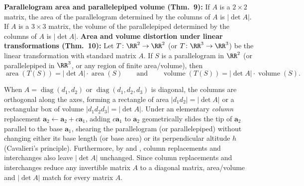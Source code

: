 \documentclass[10pt]{scrartcl}
\newcommand{\vv}[1]{\mathbf{#1}}
\begin{document}
\begin{theorem*}
  \begin{enumerate}[(a)]
    \ii \textbf{Parallelogram area and parallelepiped volume (Thm.~9):} If $A$ is a $2\times 2$ matrix, the area of the parallelogram determined by the columns of $A$ is $|\det A|$. If $A$ is a $3\times 3$ matrix, the volume of the parallelepiped determined by the columns of $A$ is $|\det A|$.
    \ii \textbf{Area and volume distortion under linear transformations (Thm.~10):} Let $T\colon\RR^2\to\RR^2$ (or $T\colon\RR^3\to\RR^3$) be the linear transformation with standard matrix $A$. If $S$ is a parallelogram in $\RR^2$ (or parallelepiped in $\RR^3$, or any region of finite area/volume), then
    \[
      \operatorname{area}(T(S)) = |\det A|\cdot\operatorname{area}(S) \qquad\text{and}\qquad \operatorname{volume}(T(S)) = |\det A|\cdot\operatorname{volume}(S).
    \]
  \end{enumerate}
\end{theorem*}
\begin{ideabox}
  When $A=\operatorname{diag}(d_1,d_2)$ or $\operatorname{diag}(d_1,d_2,d_3)$ is diagonal, the columns are orthogonal along the axes, forming a rectangle of area $|d_1d_2|=|\det A|$ or a rectangular box of volume $|d_1d_2d_3|=|\det A|$. Under an elementary \emph{column} replacement $\vv a_2\leftarrow\vv a_2+c\vv a_1$, adding $c\vv a_1$ to $\vv a_2$ geometrically slides the tip of $\vv a_2$ parallel to the base $\vv a_1$, shearing the parallelogram (or parallelepiped) without changing either its base length (or base area) or its perpendicular altitude $h$ (Cavalieri's principle). Furthermore, by  and , column replacements and interchanges also leave $|\det A|$ unchanged. Since column replacements and interchanges reduce any invertible matrix $A$ to a diagonal matrix, area/volume and $|\det A|$ match for every matrix $A$.
\end{ideabox}
\end{document}
